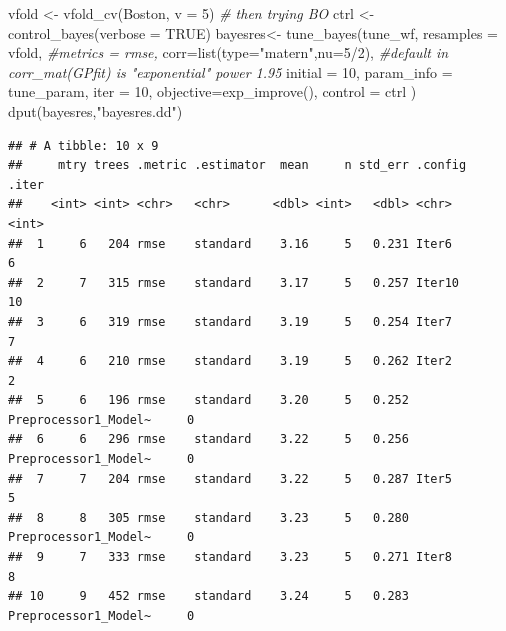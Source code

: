 \documentclass[
  ignorenonframetext,
]{beamer}
\newenvironment{Shaded}{\begin{snugshade}}{\end{snugshade}}
\newcommand{\AttributeTok}[1]{\textcolor[rgb]{0.77,0.63,0.00}{#1}}
\newcommand{\CommentTok}[1]{\textcolor[rgb]{0.56,0.35,0.01}{\textit{#1}}}
\newcommand{\ConstantTok}[1]{\textcolor[rgb]{0.00,0.00,0.00}{#1}}
\newcommand{\DecValTok}[1]{\textcolor[rgb]{0.00,0.00,0.81}{#1}}
\newcommand{\FunctionTok}[1]{\textcolor[rgb]{0.00,0.00,0.00}{#1}}
\newcommand{\NormalTok}[1]{#1}
\newcommand{\OtherTok}[1]{\textcolor[rgb]{0.56,0.35,0.01}{#1}}
\newcommand{\SpecialCharTok}[1]{\textcolor[rgb]{0.00,0.00,0.00}{#1}}
\newcommand{\StringTok}[1]{\textcolor[rgb]{0.31,0.60,0.02}{#1}}
\begin{document}
\begin{frame}[fragile]
\begin{Shaded}
\begin{Highlighting}[]
\NormalTok{vfold  }\OtherTok{\textless{}{-}} \FunctionTok{vfold\_cv}\NormalTok{(Boston, }\AttributeTok{v =} \DecValTok{5}\NormalTok{)}
\CommentTok{\# then trying BO}
\NormalTok{ctrl }\OtherTok{\textless{}{-}} \FunctionTok{control\_bayes}\NormalTok{(}\AttributeTok{verbose =} \ConstantTok{TRUE}\NormalTok{)}
\NormalTok{bayesres}\OtherTok{\textless{}{-}} \FunctionTok{tune\_bayes}\NormalTok{(tune\_wf,}
    \AttributeTok{resamples =}\NormalTok{ vfold,}
    \CommentTok{\#metrics = rmse,}
    \AttributeTok{corr=}\FunctionTok{list}\NormalTok{(}\AttributeTok{type=}\StringTok{"matern"}\NormalTok{,}\AttributeTok{nu=}\DecValTok{5}\SpecialCharTok{/}\DecValTok{2}\NormalTok{), }
    \CommentTok{\#default in corr\_mat(GPfit) is "exponential" power 1.95}
    \AttributeTok{initial =} \DecValTok{10}\NormalTok{,}
    \AttributeTok{param\_info =}\NormalTok{ tune\_param,}
    \AttributeTok{iter =} \DecValTok{10}\NormalTok{,}
    \AttributeTok{objective=}\FunctionTok{exp\_improve}\NormalTok{(),}
    \AttributeTok{control =}\NormalTok{ ctrl}
\NormalTok{  )}
\FunctionTok{dput}\NormalTok{(bayesres,}\StringTok{"bayesres.dd"}\NormalTok{)}
\end{Highlighting}
\end{Shaded}

\begin{verbatim}
## # A tibble: 10 x 9
##     mtry trees .metric .estimator  mean     n std_err .config              .iter
##    <int> <int> <chr>   <chr>      <dbl> <int>   <dbl> <chr>                <int>
##  1     6   204 rmse    standard    3.16     5   0.231 Iter6                    6
##  2     7   315 rmse    standard    3.17     5   0.257 Iter10                  10
##  3     6   319 rmse    standard    3.19     5   0.254 Iter7                    7
##  4     6   210 rmse    standard    3.19     5   0.262 Iter2                    2
##  5     6   196 rmse    standard    3.20     5   0.252 Preprocessor1_Model~     0
##  6     6   296 rmse    standard    3.22     5   0.256 Preprocessor1_Model~     0
##  7     7   204 rmse    standard    3.22     5   0.287 Iter5                    5
##  8     8   305 rmse    standard    3.23     5   0.280 Preprocessor1_Model~     0
##  9     7   333 rmse    standard    3.23     5   0.271 Iter8                    8
## 10     9   452 rmse    standard    3.24     5   0.283 Preprocessor1_Model~     0
\end{verbatim}


\end{frame}
\end{document}
